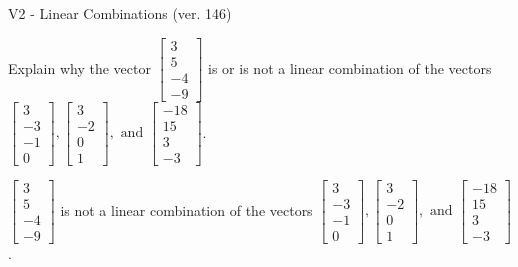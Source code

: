 \begin{exercise}
  \begin{exerciseTitle}V2 - Linear Combinations (ver. 146)\end{exerciseTitle}
  \begin{exerciseStatement}
    Explain why the vector \(\left[\begin{array}{c}
3 \\
5 \\
-4 \\
-9
\end{array}\right]\)  is or is not a linear 
	combination of the vectors \(\left[\begin{array}{c}
3 \\
-3 \\
-1 \\
0
\end{array}\right] , \left[\begin{array}{c}
3 \\
-2 \\
0 \\
1
\end{array}\right] , \text{ and } \left[\begin{array}{c}
-18 \\
15 \\
3 \\
-3
\end{array}\right]\).
	


  \end{exerciseStatement}
  \begin{exerciseAnswer}
   \(\left[\begin{array}{c}
3 \\
5 \\
-4 \\
-9
\end{array}\right]\) 
  	 is not  
	a linear combination of the vectors \(\left[\begin{array}{c}
3 \\
-3 \\
-1 \\
0
\end{array}\right] , \left[\begin{array}{c}
3 \\
-2 \\
0 \\
1
\end{array}\right] , \text{ and } \left[\begin{array}{c}
-18 \\
15 \\
3 \\
-3
\end{array}\right]\).

	
  


  \end{exerciseAnswer}
\end{exercise}